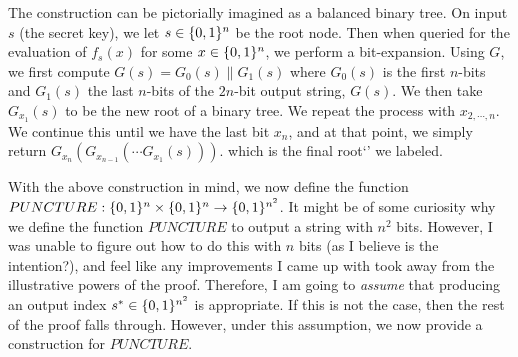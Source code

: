 \documentclass{article}
\begin{document}
\begin{enumerate}
\begin{enumerate}[,label=\alph*.]
The construction can be pictorially imagined as a balanced binary tree. On input $s$ (the secret key),
we let $s \in \{0,1\}^n$ be the root node. Then when queried for the evaluation of $f_s(x)$ for some $x \in \{0,1\}^n$,
we perform a bit-expansion. Using $G$, we first compute $G(s) = G_0(s) \| G_1(s)$ where $G_0(s)$ is the
first $n$-bits and $G_1(s)$ the last $n$-bits of the $2n$-bit output string, $G(s)$. We then take
$G_{x_1}(s)$ to be the new root of a binary tree. We repeat the process with $x_{2,\cdots,n}$. We 
continue this until we have the last bit $x_n$, and at that point, we simply return $G_{x_n}(G_{x_{n-1}}(\cdots G_{x_1}(s)))$.
which is the final \mdcode{}root\textquoteleft{}\textquoteright{} we labeled.%

With the above construction in mind, we now define the function $PUNCTURE: \{0,1\}^n \times \{0,1\}^n \to \{0,1\}^{n^2}$.
It might be of some curiosity why we define the function $PUNCTURE$ to output a string with $n^2$ bits.
However, I was unable to figure out how to do this with $n$ bits (as I believe is the intention?), and
feel like any improvements I came up with took away from the illustrative powers of the proof. Therefore,
I am going to \emph{assume} that producing an output index $s^* \in \{0,1\}^{n^2}$ is appropriate. If this is
not the case, then the rest of the proof falls through. However, under this assumption, we now provide
a construction for $PUNCTURE$.%


\end{enumerate}
\end{enumerate}
\end{document}
